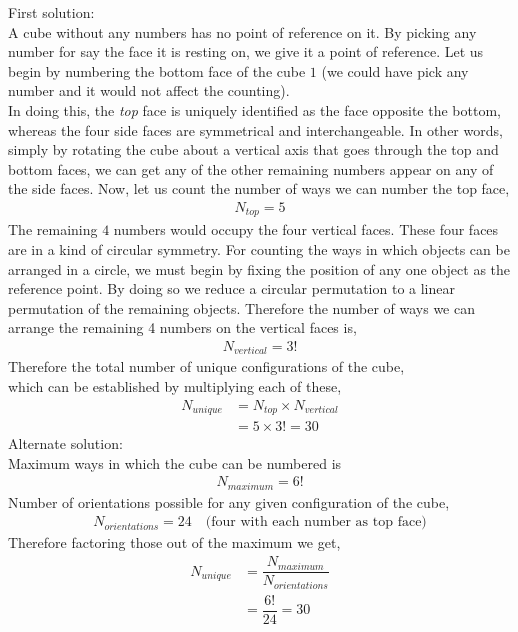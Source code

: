 \fi 

\begin{solution}[\halfpage]
  First solution: \\
  A cube without any numbers has no point of reference on it. By picking
  any number for say the face it is resting on, we give it a point of
  reference. Let us begin by numbering the bottom face of the cube $1$ 
  (we could have pick any number and it would not affect the counting). \\
  In doing this, the \textit{top} face is uniquely identified as the face
  opposite the bottom, whereas the four side faces are symmetrical and
  interchangeable. In other words, simply by rotating the cube about a
  vertical axis that goes through the top and bottom faces, we can get
  any of the other remaining numbers appear on any of the side faces.
  Now, let us count the number of ways we can number the top face,
  \begin{align}
     N_{top} = 5 \nonumber
  \end{align}
  The remaining $4$ numbers would occupy the four vertical faces.
  These four faces are in a kind of circular symmetry. For counting the 
  ways in which objects can be arranged in a circle, we must begin by 
  fixing the position of any one object as the reference point.
  By doing so we reduce a circular permutation to a linear permutation
  of the remaining objects. Therefore the number of ways we can arrange
  the remaining 4 numbers on the vertical faces is,
  \begin{align}
     N_{vertical} = 3! \nonumber
  \end{align}
  Therefore the total number of unique configurations of the cube, \\
  which can be established by multiplying each of these,
  \begin{align}
    N_{unique} &= N_{top} \times N_{vertical} \nonumber \\
               &= 5 \times 3! = 30 \nonumber 
  \end{align}
  Alternate solution:\\
  Maximum ways in which the cube can be numbered is 
  \begin{align}
    N_{maximum} = 6! \nonumber
  \end{align}
  Number of orientations possible for any given configuration of the cube,
  \begin{align}
    N_{orientations} = 24 \quad\text{(four with each number as top face)} \nonumber
  \end{align}
  Therefore factoring those out of the maximum we get,
  \begin{align}
    N_{unique} &= \dfrac{N_{maximum}}{N_{orientations}} \nonumber \\
               &= \dfrac{6!}{24} = 30 \nonumber
  \end{align}   
\end{solution}

